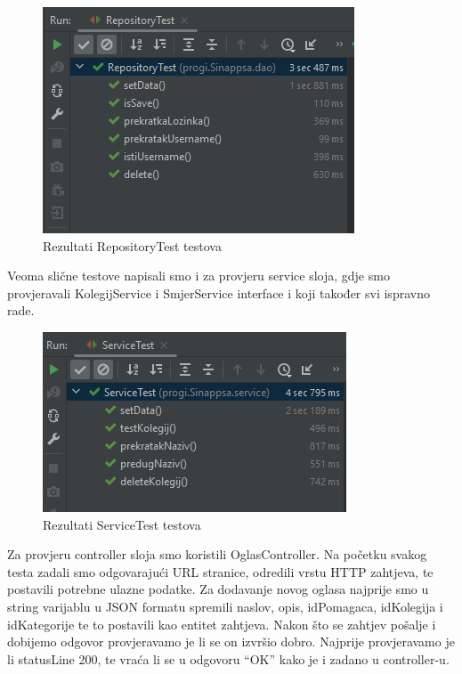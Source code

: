 			\begin{figure}[H]
				\includegraphics[scale=1]{slike/ispitivanje1.PNG} 
				\centering
				\caption{Rezultati RepositoryTest testova}
				\label{fig:RepositoryTest}
			\end{figure}
			\noindent Veoma slične testove napisali smo i za provjeru service sloja, gdje smo provjeravali KolegijService i SmjerService interface i koji također svi ispravno rade.
			
			\begin{figure}[H]
				\includegraphics[scale=1]{slike/ispitivanje2.PNG} 
				\centering
				\caption{Rezultati ServiceTest testova}
				\label{fig:ServiceTest}
			\end{figure}
			
			\noindent Za provjeru controller sloja smo koristili OglasController. Na početku svakog testa zadali smo odgovarajući URL stranice, odredili vrstu HTTP zahtjeva, te postavili potrebne ulazne podatke. Za dodavanje novog oglasa najprije smo u string varijablu u JSON formatu spremili naslov, opis, idPomagaca, idKolegija i idKategorije te to postavili kao entitet zahtjeva. Nakon što se zahtjev pošalje i dobijemo odgovor provjeravamo je li se on izvršio dobro. Najprije provjeravamo je li statusLine 200, te vraća li se u odgovoru “OK” kako je i zadano u controller-u.
			
